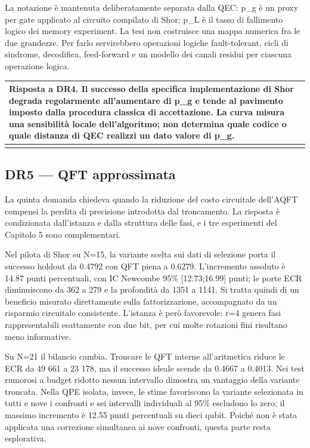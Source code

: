 La notazione è mantenuta deliberatamente separata dalla QEC: p\_g è un proxy per gate applicato al circuito compilato di Shor; p\_L è il tasso di fallimento logico dei memory experiment. La tesi non costruisce una mappa numerica fra le due grandezze. Per farlo servirebbero operazioni logiche fault-tolerant, cicli di sindrome, decodifica, feed-forward e un modello dei canali residui per ciascuna operazione logica.

{\def\LTcaptype{none} %
\begin{longtable}[]{@{}
  >{\raggedright\arraybackslash}p{}@{}}
\toprule\noalign{}
\begin{minipage}[b]{\linewidth}\raggedright
\textbf{Risposta a DR4.} Il successo della specifica implementazione di Shor degrada regolarmente all'aumentare di p\_g e tende al pavimento imposto dalla procedura classica di accettazione. La curva misura una sensibilità locale dell'algoritmo; non determina quale codice o quale distanza di QEC realizzi un dato valore di p\_g.
\end{minipage} \\
\midrule\noalign{}
\endhead
\bottomrule\noalign{}
\endlastfoot
\end{longtable}
}

\subsection{DR5 --- QFT approssimata}\label{sec:finale_6_1_5}

La quinta domanda chiedeva quando la riduzione del costo circuitale dell'AQFT compensi la perdita di precisione introdotta dal troncamento. La risposta è condizionata dall'istanza e dalla struttura delle fasi, e i tre esperimenti del Capitolo 5 sono complementari.

Nel pilota di Shor su N=15, la variante scelta sui dati di selezione porta il successo holdout da 0.4792 con QFT piena a 0.6279. L'incremento assoluto è 14.87 punti percentuali, con IC Newcombe 95\% {[}12.73;16.99{]} punti; le porte ECR diminuiscono da 362 a 279 e la profondità da 1351 a 1141. Si tratta quindi di un beneficio misurato direttamente sulla fattorizzazione, accompagnato da un risparmio circuitale consistente. L'istanza è però favorevole: r=4 genera fasi rappresentabili esattamente con due bit, per cui molte rotazioni fini risultano meno informative.

Su N=21 il bilancio cambia. Troncare le QFT interne all'aritmetica riduce le ECR da 49 661 a 23 178, ma il successo ideale scende da 0.4667 a 0.4013. Nei test rumorosi a budget ridotto nessun intervallo dimostra un vantaggio della variante troncata. Nella QPE isolata, invece, le stime favoriscono la variante selezionata in tutti e nove i confronti e sei intervalli individuali al 95\% escludono lo zero; il massimo incremento è 12.55 punti percentuali su dieci qubit. Poiché non è stata applicata una correzione simultanea ai nove confronti, questa parte resta esplorativa.

